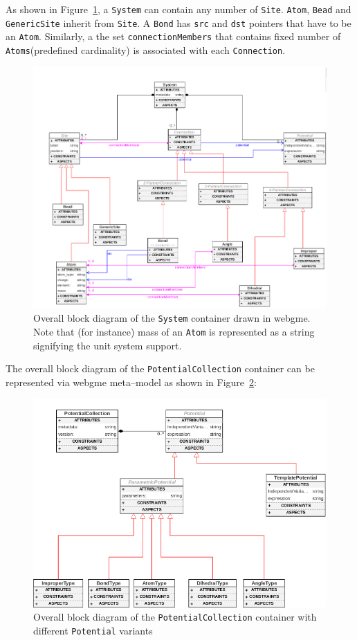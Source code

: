 \documentclass[12pt]{article}
\begin{document}
As shown in Figure~\ref{fig:TopoDiagram}, a \texttt{System} can contain any number of \texttt{Site}. \texttt{Atom}, \texttt{Bead} and \texttt{GenericSite} inherit from \texttt{Site}. A \texttt{Bond} has \texttt{src} and \texttt{dst} pointers that have to be an \texttt{Atom}. Similarly, a the set \texttt{connectionMembers} that contains fixed number of \texttt{Atoms}(predefined cardinality) is associated with each \texttt{Connection}.

\begin{figure}[ht]
    \centering
    \includegraphics[width=\textwidth]{docs/topo}
    \caption{Overall block diagram of the \texttt{System} container drawn in webgme. Note that (for instance) mass of an \texttt{Atom} is represented as a string signifying the unit system support.}
    \label{fig:TopoDiagram}
\end{figure}

\noindent The overall block diagram of the \texttt{PotentialCollection} container can be represented via webgme meta--model as shown in Figure~\ref{fig:FFDiagram}:

\begin{figure}[ht]
    \centering
    \includegraphics[width=\textwidth]{docs/pot}
    \caption{Overall block diagram of the \texttt{PotentialCollection} container with different \texttt{Potential} variants}
    \label{fig:FFDiagram}
\end{figure}
\end{document}
